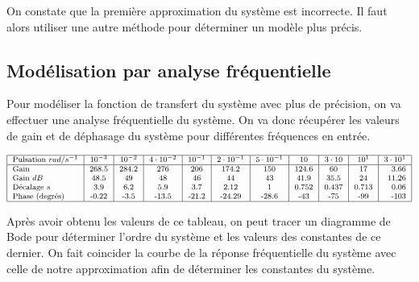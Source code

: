 \documentclass[12pt]{report}
\begin{document}
On constate que la première approximation du système est incorrecte. Il faut alors utiliser
une autre méthode pour déterminer un modèle plus précis.



\subsection{Modélisation par analyse fréquentielle}

Pour modéliser la fonction de transfert du système avec plus de précision, on va
effectuer une analyse fréquentielle du système. On va donc récupérer les valeurs de 
gain et de déphasage du système pour différentes fréquences en entrée.

\begin{equation}
\footnotesize
\begin{tabular}{| l | c | c | c | c | c | c | c | c | c | r |}
  \hline
  Pulsation $rad/s^{-1}$ & $10^{-3}$ & $10^{-2}$ & $4 \cdot 10^{-2}$ & $10^{-1}$ & $2 \cdot 10^{-1}$ & $5 \cdot 10^{-1}$ & $ 10 $ & $ 3 \cdot 10 $ & $ 10^1 $ & $ 3 \cdot 10^1 $  \\
  \hline
  Gain & 268.5 & 284.2 & 276 & 206 & 174.2 & 150 & 124.6 & 60 & 17 & 3.66 \\
  Gain $dB$ & 48.5 & 49 & 48 & 46 & 44 & 43 & 41.9 & 35.5 & 24 & 11.26 \\
  Décalage $s$ & 3.9 & 6.2 & 5.9 & 3.7 & 2.12 & 1 & 0.752 & 0.437 & 0.713 & 0.06 \\
  Phase (degrés) & -0.22 & -3.5 & -13.5 & -21.2 & -24.29 & -28.6 & -43 & -75 & -99 & -103 \\
  \hline
\end{tabular}
\end{equation}

Après avoir obtenu les valeurs de ce tableau, on peut tracer un diagramme de Bode pour
déterminer l'ordre du système et les valeurs des constantes de ce dernier. On fait 
coincider la courbe de la réponse fréquentielle du système avec celle de notre approximation
afin de déterminer les constantes du système.
\end{document}
